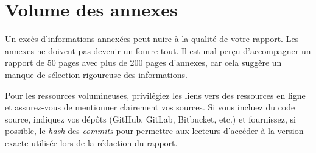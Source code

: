 \section{Volume des annexes}

Un excès d'informations annexées peut nuire à la qualité de votre rapport. Les annexes ne doivent pas devenir un fourre-tout. Il est mal perçu d'accompagner un rapport de 50 pages avec plus de 200 pages d'annexes, car cela suggère un manque de sélection rigoureuse des informations.

Pour les ressources volumineuses, privilégiez les liens vers des ressources en ligne et assurez-vous de mentionner clairement vos sources. Si vous incluez du code source, indiquez vos dépôts (GitHub, GitLab, Bitbucket, etc.) et fournissez, si possible, le \emph{hash} des \emph{commits} pour permettre aux lecteurs d'accéder à la version exacte utilisée lors de la rédaction du rapport.